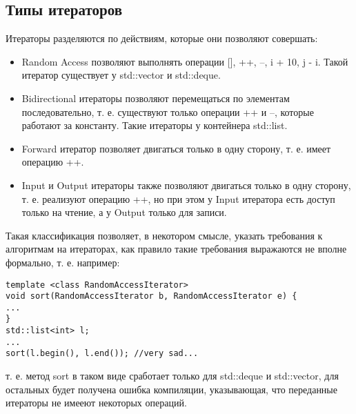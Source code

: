 \subsection{Типы итераторов}

Итераторы разделяются по действиям, которые они позволяют совершать:

\begin{itemize}
\item Random Access позволяют выполнять операции [], ++, --, i + 10, j - i. Такой итератор существует у std::vector и std::deque.

\item Bidirectional итераторы позволяют перемещаться по элементам последовательно, т. е. существуют только операции ++ и --, которые работают за константу.
Такие итераторы у контейнера std::list.

\item Forward итератор позволяет двигаться только в одну сторону, т. е. имеет операцию ++.

\item Input и Output итераторы также позволяют двигаться только в одну сторону, т. е. реализуют операцию ++, но при этом у Input итератора есть доступ только
на чтение, а у Output только для записи.
\end{itemize}

Такая классификация позволяет, в некотором смысле, указать требования к алгоритмам на итераторах, как правило такие требования выражаются не вполне формально,
т. е. например:
\begin{lstlisting}
template <class RandomAccessIterator>
void sort(RandomAccessIterator b, RandomAccessIterator e) {
...
}
std::list<int> l;
...
sort(l.begin(), l.end()); //very sad...
\end{lstlisting}
т. е. метод sort в таком виде сработает только для std::deque и std::vector, для остальных будет получена ошибка компиляции, указывающая, что переданные итераторы
не имееют некоторых операций.


